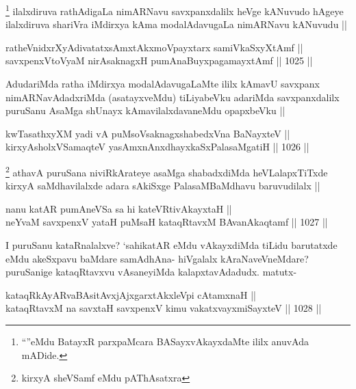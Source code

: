 \begin{artha}
\footnote{``\stext''eMdu BatayxR parxpaMcara BASayxvAkayxdaMte ililx anuvAda mADide.}
ilalxdiruva rathAdigaLa nimARNavu savxpanxdalilx heVge kANuvudo
hAgeye ilalxdiruva shariVra iMdirxya kAma modalAdavugaLa nimARNavu kANuvudu ||
\end{artha}

\begin{shl}
ratheVnidxrXyAdivatatxsAmxtAkxmoV\s payxtarx samiVkaSxyXtAmf || \\
savxpenxV\s toV\s yaM nirAsaknagxH pumAnaBuyxpagamayxtAmf ||  1025 ||  
\end{shl}

\begin{artha}
AdudariMda ratha iMdirxya modalAdavugaLaMte ililx kAmavU savxpanx nimARNavAdadxriMda (asatayxveMdu) tiLiyabeVku adariMda savxpanxdalilx puruSanu AsaMga shUnayx kAmavilalxdavaneMdu opapxbeVku ||
\end{artha}


\begin{shl}
kwTasathxyXM yadi vA puMsoV\s saknagxshabedxVna BaNayxteV ||  \\
kirxyAsholxVSamaqteV yasAmxnAnxdhayxkaSxPalasaMgatiH ||  1026 ||  
\end{shl}

\begin{artha}
\footnote{kirxyA sheVSamf eMdu pAThAsatxra}
athavA puruSana niviRkArateye asaMga shabadxdiMda heVLalapxTiTxde kirxyA saMdhavilalxde adara sAkiSxge PalasaMBaMdhavu baruvudilalx ||
\end{artha}


\begin{shl}
nanu katAR pumAneVSa sa hi kateVRtivAkayxtaH || \\
neYvaM savxpenxV yataH puMsaH kataqRtavxM BAvanAkaqtamf ||  1027 ||  
\end{shl}

\begin{artha}
I puruSanu kataRnalalxve? `sahikatAR eMdu vAkayxdiMda tiLidu barutatxde eMdu akeSxpavu baMdare samAdhAna- hiVgalalx kAraNaveVneMdare? puruSanige kataqRtavxvu vAsaneyiMda kalapxtavAdadudx. matutx-
\end{artha}

\begin{shl}
kataqRkAyARvaBAsitAvxjAjxgarxtAkxleV\s pi cA\s \s tamxnaH ||  \\
kataqRtavxM na savxtaH savxpenxV kimu vakatxvayxmiSayxteV ||  1028 ||  
\end{shl}

